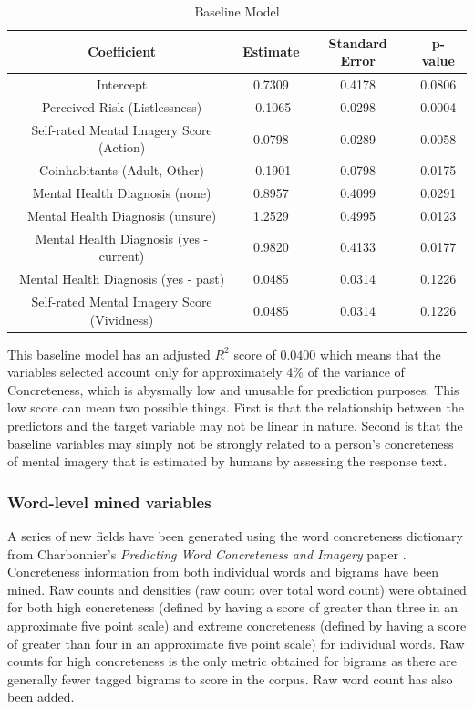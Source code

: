 \documentclass[12pt, a4paper]{article}
\begin{document}
\begin{table}[ht]
\centering
\begin{tabular}{||c c c c||} 
 \hline
 Coefficient & Estimate & Standard Error & p-value \\ [0.5ex] 
 \hline\hline
 Intercept & 0.7309 & 0.4178 & 0.0806 \\ 
 Perceived Risk (Listlessness) & -0.1065 & 0.0298 & 0.0004 \\
 Self-rated Mental Imagery Score (Action)  & 0.0798 & 0.0289 & 0.0058 \\
 Coinhabitants (Adult, Other)\footnotemark & -0.1901 & 0.0798 & 0.0175 \\
 Mental Health Diagnosis (none) & 0.8957 & 0.4099 & 0.0291 \\ 
Mental Health Diagnosis (unsure) & 1.2529 & 0.4995 & 0.0123 \\
Mental Health Diagnosis (yes - current) & 0.9820 & 0.4133 & 0.0177 \\
Mental Health Diagnosis (yes - past) & 0.0485 & 0.0314 & 0.1226\\
 Self-rated Mental Imagery Score (Vividness)  & 0.0485 & 0.0314 & 0.1226 \\ [1ex] 
 \hline
\end{tabular}
\caption{Baseline Model}
\label{table:1}
\end{table}

This baseline model has an adjusted $R^2$ score of $0.0400$ which means that the variables selected account only for approximately 4\% of the variance of Concreteness, which is abysmally low and unusable for prediction purposes. This low score can  mean two possible things. First is that the relationship between the predictors and the target variable may not be linear in nature. Second is that the baseline variables may simply not be strongly related to a person's concreteness of mental imagery that is estimated by humans by assessing the response text.  

\subsubsection{Word-level mined variables}
A series of new fields have been generated using the word concreteness dictionary from Charbonnier's \textit{Predicting Word Concreteness and Imagery} paper \cite{charbonnier-wartena-2019-predicting}. Concreteness information from both individual words and bigrams have been mined. Raw counts and densities (raw count over total word count) were obtained for both high concreteness (defined by having a score of greater than three in an approximate five point scale) and extreme concreteness (defined by having a score of greater than four in an approximate five point scale) for individual words. Raw counts for high concreteness is the only metric obtained for bigrams as there are generally fewer tagged bigrams to score in the corpus. Raw word count has also been added.
\end{document}
